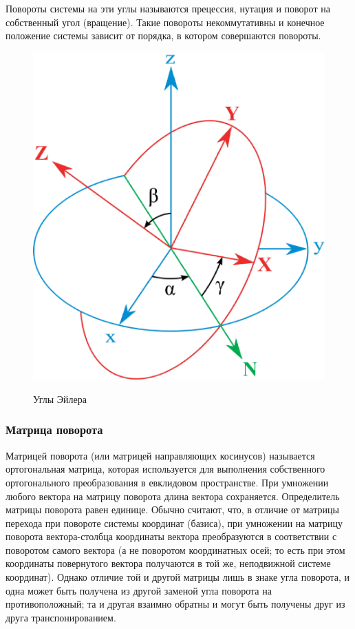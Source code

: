 Повороты системы на эти углы называются прецессия, нутация и поворот на собственный угол (вращение).
Такие повороты некоммутативны и конечное положение системы зависит от порядка, в котором совершаются повороты. 

\begin{figure}[ht!]
\begin{center}
\includegraphics[scale=0.25]{./Rigidbody/Eulerangles.eps}  \\
\caption{Углы Эйлера}\label{Eulerangles}
\end{center}
\end{figure}

\subsubsection{Матрица поворота}
Матрицей поворота (или матрицей направляющих косинусов) называется ортогональная матрица,
которая используется для выполнения собственного ортогонального преобразования в евклидовом пространстве.
При умножении любого вектора на матрицу поворота длина вектора сохраняется. Определитель матрицы поворота равен единице.
Обычно считают, что, в отличие от матрицы перехода при повороте системы координат (базиса),
при умножении на матрицу поворота вектора-столбца координаты вектора преобразуются в соответствии с поворотом
самого вектора (а не поворотом координатных осей; то есть при этом координаты повернутого вектора получаются в той же,
неподвижной системе координат). Однако отличие той и другой матрицы лишь в знаке угла поворота,
и одна может быть получена из другой заменой угла поворота на противоположный; та и другая взаимно обратны и могут быть получены
друг из друга транспонированием.

